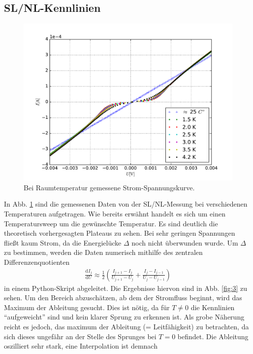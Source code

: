 \documentclass[twoside,        %
               BCOR12mm,       %
               english,ngerman, %
               fleqn,headsepline=false,footsepline=false
              ]{Vorlage/MFPREPORT}
\renewcommand{\d}{\ensuremath{\mathrm{d}}} %
\newcommand{\diff}[3][]{\ensuremath{\frac{\d^{#1}#2}{\d#3^{#1}}}} %
\begin{document}
\subsection{SL/NL-Kennlinien}
\begin{figure}[]
    \centering
    \includegraphics[width=\textwidth]{fig/2.pdf}
    \caption{Bei Raumtemperatur gemessene Strom-Spannungskurve.}
    \label{fig:2}
\end{figure}
In Abb. \ref{fig:2} sind die gemessenen Daten von der SL/NL-Messung bei verschiedenen Temperaturen
aufgetragen. Wie bereits erwähnt handelt es sich um einen Temperatursweep um
die gewünschte Temperatur. Es sind deutlich die theoretisch vorhergesagten
Plateaus zu sehen. Bei sehr geringen Spannungen fließt kaum Strom, da die
Energielücke $\Delta$ noch nicht überwunden wurde. Um $\Delta$ zu bestimmen,
werden die Daten numerisch mithilfe des zentralen Differenzenquotienten
\begin{align}
    \diff{I_j}{U}\approx\frac{1}{2}\left(\frac{I_{j+1}-I_j}{U_{j+1}-U_{j}}+\frac{I_{j}-I_{j-1}}{U_{j}-U_{j-1}}\right)
    \label{eq:diffquot}
\end{align}
in einem Python-Skript abgeleitet. Die Ergebnisse hiervon sind in Abb.
\ref{fig:3} zu sehen. Um den Bereich abzuschätzen, ab dem der
Stromfluss beginnt, wird das Maximum der Ableitung gesucht. Dies ist nötig, da
für $T\neq0$ die Kennlinien ``aufgeweicht'' sind und kein klarer Sprung zu
erkennen ist. Als grobe Näherung reicht es jedoch, das maximum der Ableitung
(= Leitfähigkeit) zu
betrachten, da sich dieses ungefähr an der Stelle des Sprunges bei $T=0$
befindet. Die Ableitung oszilliert sehr stark, eine Interpolation ist demnach
\end{document}
